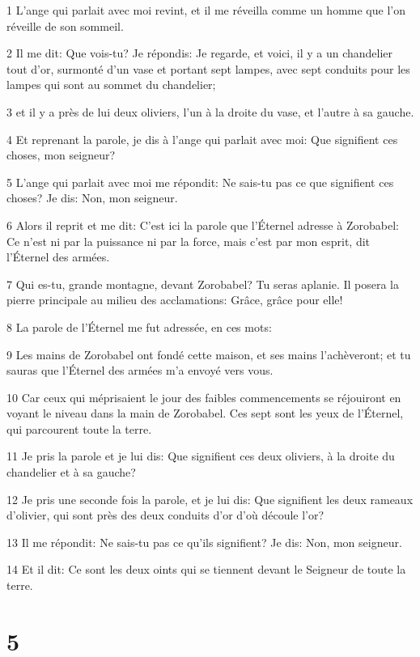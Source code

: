 \par 1 L'ange qui parlait avec moi revint, et il me réveilla comme un homme que l'on réveille de son sommeil.
\par 2 Il me dit: Que vois-tu? Je répondis: Je regarde, et voici, il y a un chandelier tout d'or, surmonté d'un vase et portant sept lampes, avec sept conduits pour les lampes qui sont au sommet du chandelier;
\par 3 et il y a près de lui deux oliviers, l'un à la droite du vase, et l'autre à sa gauche.
\par 4 Et reprenant la parole, je dis à l'ange qui parlait avec moi: Que signifient ces choses, mon seigneur?
\par 5 L'ange qui parlait avec moi me répondit: Ne sais-tu pas ce que signifient ces choses? Je dis: Non, mon seigneur.
\par 6 Alors il reprit et me dit: C'est ici la parole que l'Éternel adresse à Zorobabel: Ce n'est ni par la puissance ni par la force, mais c'est par mon esprit, dit l'Éternel des armées.
\par 7 Qui es-tu, grande montagne, devant Zorobabel? Tu seras aplanie. Il posera la pierre principale au milieu des acclamations: Grâce, grâce pour elle!
\par 8 La parole de l'Éternel me fut adressée, en ces mots:
\par 9 Les mains de Zorobabel ont fondé cette maison, et ses mains l'achèveront; et tu sauras que l'Éternel des armées m'a envoyé vers vous.
\par 10 Car ceux qui méprisaient le jour des faibles commencements se réjouiront en voyant le niveau dans la main de Zorobabel. Ces sept sont les yeux de l'Éternel, qui parcourent toute la terre.
\par 11 Je pris la parole et je lui dis: Que signifient ces deux oliviers, à la droite du chandelier et à sa gauche?
\par 12 Je pris une seconde fois la parole, et je lui dis: Que signifient les deux rameaux d'olivier, qui sont près des deux conduits d'or d'où découle l'or?
\par 13 Il me répondit: Ne sais-tu pas ce qu'ils signifient? Je dis: Non, mon seigneur.
\par 14 Et il dit: Ce sont les deux oints qui se tiennent devant le Seigneur de toute la terre.

\chapter{5}

